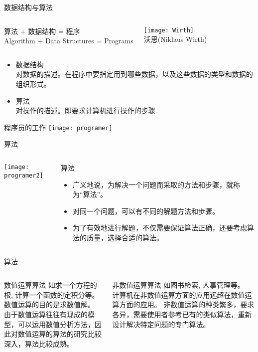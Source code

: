 \begin{frame}{数据结构与算法}
\begin{columns}
	\begin{block}{}
		算法 + 数据结构 = 程序\\
		Algorithm + Data Structures = Programs
	\end{block}
	\texttt{[image: Wirth]}\\
	沃思(Niklaus Wirth)
\end{columns}
\begin{itemize}
	\item 数据结构\\
	对数据的描述。在程序中要指定用到哪些数据，以及这些数据的类型和数据的组织形式。
	\item 	算法\\
	对操作的描述。即要求计算机进行操作的步骤	
\end{itemize}
\end{frame}

\begin{frame}{程序员的工作}
\texttt{[image: programer]}
\end{frame}

\begin{frame}{算法}
\begin{columns}
	\texttt{[image: programer2]}
	\begin{block}{算法}
		\begin{itemize}
			\item 广义地说，为解决一个问题而采取的方法和步骤，就称为“算法”。
		    \item 对同一个问题，可以有不同的解题方法和步骤。
		    \item 为了有效地进行解题，不仅需要保证算法正确，还要考虑算法的质量，选择合适的算法。
		\end{itemize} 
	\end{block}
\end{columns}
\end{frame}

\begin{frame}{算法}
\begin{columns}
	\begin{block}{数值运算算法}
	   如求一个方程的根, 计算一个函数的定积分等。\\
	   数值运算的目的是求数值解。\\
	   由于数值运算往往有现成的模型，可以运用数值分析方法，因此对数值运算的算法的研究比较深入，算法比较成熟。	
	\end{block}
	\begin{block}{非数值运算算法}
		如图书检索, 人事管理等。\\
		计算机在非数值运算方面的应用远超在数值运算方面的应用。
		非数值运算的种类繁多，要求各异，需要使用者参考已有的类似算法，重新设计解决特定问题的专门算法。
	\end{block}
\end{columns}
\end{frame}

